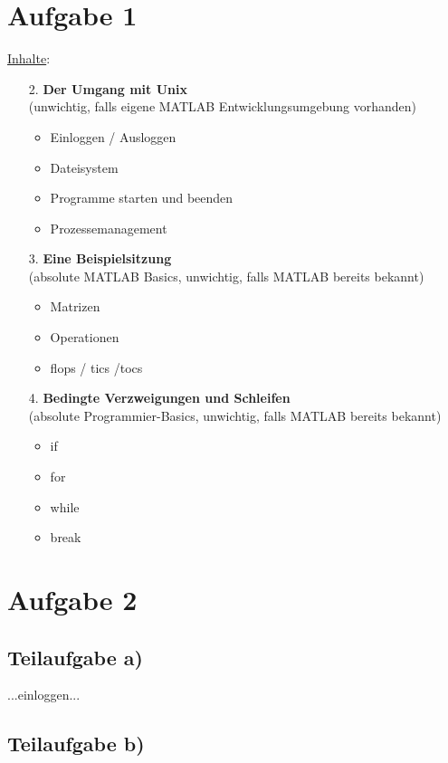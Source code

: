 \documentclass{llncs}
\begin{document}
\section*{Aufgabe 1}

\underline{Inhalte}:
\begin{itemize}
\item[2.] \textbf{Der Umgang mit Unix}\\(unwichtig, falls eigene MATLAB Entwicklungsumgebung vorhanden)
\begin{itemize}
\item Einloggen / Ausloggen
\item Dateisystem
\item Programme starten und beenden
\item Prozessemanagement
\end{itemize}
\item[3.] \textbf{Eine Beispielsitzung}\\(absolute MATLAB Basics, unwichtig, falls MATLAB bereits bekannt)
\begin{itemize}
\item Matrizen
\item Operationen
\item flops / tics /tocs
\end{itemize}
\item[4.] \textbf{Bedingte Verzweigungen und Schleifen}\\(absolute Programmier-Basics, unwichtig, falls MATLAB bereits bekannt)
\begin{itemize}
\item if
\item for
\item while
\item break
\end{itemize}
\end{itemize}


\section*{Aufgabe 2}

\subsection*{Teilaufgabe a)}

...einloggen...

\subsection*{Teilaufgabe b)}
\end{document}
